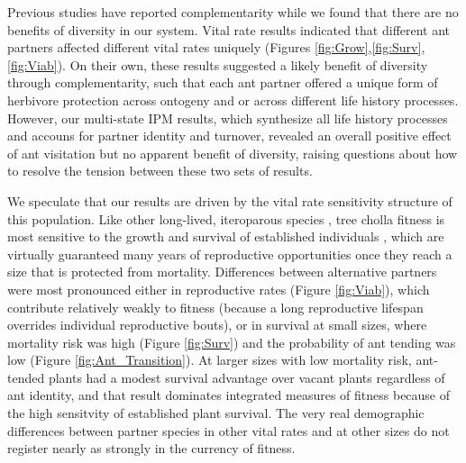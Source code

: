 \documentclass[11pt]{article}
\begin{document}
Previous studies have reported complementarity \citep{Palmer2010,Rezende2007,Afkhami2021} while we found that there are no benefits of diversity in our system.
Vital rate results indicated that different ant partners affected different vital rates uniquely (Figures \ref{fig:Grow},\ref{fig:Surv},\ref{fig:Viab}).
On their own, these results suggested a likely benefit of diversity through complementarity, such that each ant partner offered a unique form of herbivore protection across ontogeny and or across different life history processes. 
However, our multi-state IPM results, which synthesize all life history processes and accouns for partner identity and turnover, revealed an overall positive effect of ant visitation but no apparent benefit of diversity, raising questions about how to resolve the tension between these two sets of results. 

We speculate that our results are driven by the vital rate sensitivity structure of this population. 
Like other long-lived, iteroparous species \citep{franco2004comparative}, tree cholla fitness is most sensitive to the growth and survival of established individuals \citep{Miller2009,elderd2016quantifying}, which are virtually guaranteed many years of reproductive opportunities once they reach a size that is protected from mortality. 
Differences between alternative partners were most pronounced either in reproductive rates (Figure \ref{fig:Viab}), which contribute relatively weakly to fitness (because a long reproductive lifespan overrides individual reproductive bouts), or in survival at small sizes, where mortality risk was high (Figure \ref{fig:Surv}) and the probability of ant tending was low (Figure \ref{fig:Ant_Transition}). 
At larger sizes with low mortality risk, ant-tended plants had a modest survival advantage over vacant plants regardless of ant identity, and that result dominates integrated measures of fitness because of the high sensitvity of established plant survival. 
The very real demographic differences between partner species in other vital rates and at other sizes do not register nearly as strongly in the currency of fitness. 
\end{document}
